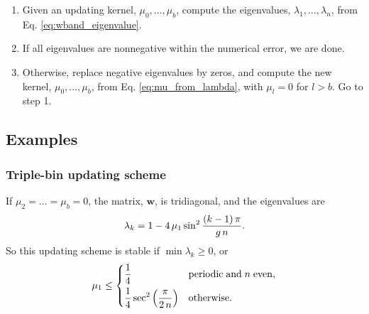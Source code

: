 \documentclass[reprint, superscriptaddress, floatfix]{revtex4-1}
\begin{document}
%
\begin{enumerate}
  \item
    Given an updating kernel, $\mu_0, \dots, \mu_b$,
    compute the eigenvalues,
    $\lambda_1, \dots, \lambda_n$,
    from Eq. \eqref{eq:wband_eigenvalue}.
  \item
    If all eigenvalues are nonnegative within the numerical error,
    we are done. %
  \item
    Otherwise, replace negative eigenvalues by zeros,
    and compute the new kernel,
    $\mu_0, \dots, \mu_b$, from
    Eq. \eqref{eq:mu_from_lambda},
    with $\mu_l = 0$ for $l > b$.
    Go to step 1.
\end{enumerate}



\subsection{Examples}



\subsubsection{\label{sec:nnscheme}
Triple-bin updating scheme}



If $\mu_2 = \dots = \mu_b = 0$,
the matrix, $\mathbf w$, is tridiagonal,
and the eigenvalues are
\begin{equation}
  \lambda_k
  =
  1 -
  4 \, \mu_1 \sin^2
  \frac{ (k - 1) \, \pi }
       {       g \, n   }
  .
\notag
\end{equation}
%
So this updating scheme is stable if
$\min \lambda_k \ge 0$,
or
\begin{equation}
  \mu_1 \le
  \begin{dcases}
    \frac 1 4
    & \mathrm{periodic \; and \;} n \mathrm{ \; even,}
    \\
    \frac 1 4
    \sec^2
    \left( \frac{  \pi   }
                { 2 \, n }
    \right)
    & \mathrm{otherwise}.
  \end{dcases}
\notag
\end{equation}
\end{document}
